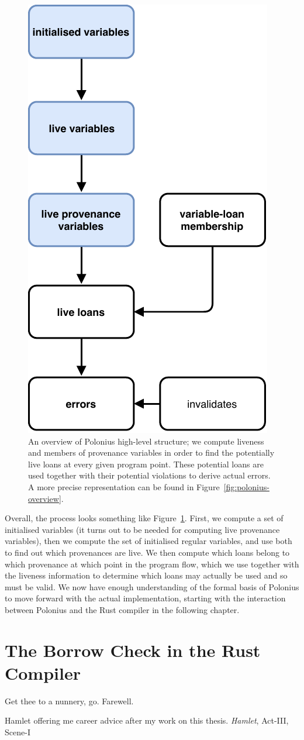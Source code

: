 \documentclass[11pt,a4paper,twoside,openany]{report}
\renewcommand\_{\textunderscore\allowbreak}
\begin{document}
\begin{figure}[h!]
  \centering
  \includegraphics[width=0.4\linewidth]{Graphs/polonius-high-level-overview}
  \caption[Polonius High-Level Overview]{An overview of Polonius high-level
    structure; we compute liveness and members of provenance variables in order
    to find the potentially live loans at every given program point. These
    potential loans are used together with their potential violations to derive
    actual errors. A more precise representation can be found in
    Figure~\ref{fig:polonius-overview}.}\label{fig:polonius-high-level-overview}
\end{figure}

Overall, the process looks something like
Figure~\ref{fig:polonius-high-level-overview}. First, we compute a set of
initialised variables (it turns out to be needed for computing live provenance
variables), then we compute the set of initialised regular variables, and use
both to find out which provenances are live. We then compute which loans belong
to which provenance at which point in the program flow, which we use together
with the liveness information to determine which loans may actually be used and
so must be valid. We now have enough understanding of the formal basis of
Polonius to move forward with the actual implementation, starting with the
interaction between Polonius and the Rust compiler in the following chapter.


\chapter{The Borrow Check in the Rust Compiler}\label{cha:borrow-check-compiler}
\epigraph{Get thee to a nunnery, go. Farewell.}%
{Hamlet offering me career advice after my work on this thesis. \textit{Hamlet},
  Act-III, Scene-I}
\end{document}
